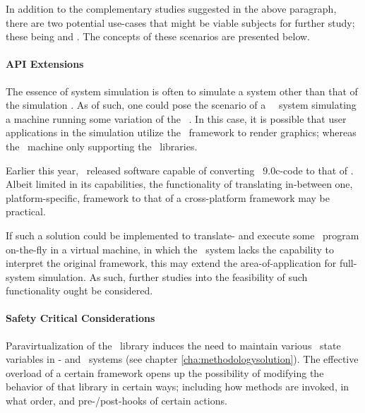 \noindent
In addition to the complementary studies suggested in the above paragraph, there are two potential use-cases that might be viable subjects for further study; these being  and .
The concepts of these scenarios are presented below.

\paragraph{API Extensions}
\label{par:futurework_apiextensions}
The essence of system simulation is often to simulate a system other than that of the simulation \dvttermhost .
As of such, one could pose the scenario of a \dvttermlinux\ \dvttermhost\ system simulating a machine running some variation of the \dvttermwindows\ \dvttermos .
In this case, it is possible that user applications in the simulation utilize the \dvttermdirectx\ framework to render graphics; whereas the \dvttermhost\ machine only supporting the \dvttermopengl\ libraries.

Earlier this year, \dvttermvalve\ released software capable of converting \dvttermdirectx\ $9.0$c-code to that of \dvttermopengl {}.
Albeit limited in its capabilities, the functionality of translating in-between one, platform-specific, framework to that of a cross-platform framework may be practical.

If such a solution could be implemented to translate- and execute some \dvttermtarget\ program on-the-fly in a virtual machine, in which the \dvttermhost\ system lacks the capability to interpret the original framework, this may extend the area-of-application for full-system simulation.
As such, further studies into the feasibility of such functionality ought be considered.

\paragraph{Safety Critical Considerations}
\label{par:futurework_safetycriticalconsiderations}
Paravirtualization of the \dvttermopenglestwopointo\ library induces the need to maintain various \dvttermopengl\ state variables in \dvttermtarget - and \dvttermhost\ systems (see chapter \ref{cha:methodologysolution}).
The effective overload of a certain framework opens up the possibility of modifying the behavior of that library in certain ways; including how methods are invoked, in what order, and pre-/post-hooks of certain actions.

